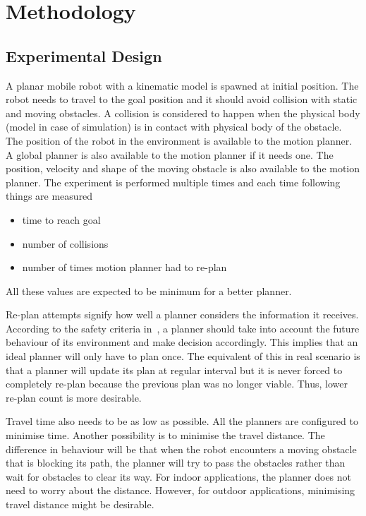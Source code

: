 \chapter{Methodology}

\section{Experimental Design}
\label{sec:experimental_design}
A planar mobile robot with a kinematic model is spawned at initial position. 
The robot needs to travel to the goal position and it should avoid collision with static and moving obstacles. 
A collision is considered to happen when the physical body (model in case of simulation)
is in contact with physical body of the obstacle.
The position of the robot in the environment is available to the motion planner.
A global planner is also available to the motion planner if it needs one.
The position, velocity and shape of the moving obstacle is also available to the motion
planner.
The experiment is performed multiple times and each time following things are measured
\begin{itemize}
    \item time to reach goal
    \item number of collisions
    \item number of times motion planner had to re-plan
\end{itemize}
All these values are expected to be minimum for a better planner.

Re-plan attempts signify how well a planner considers the information it receives. According to
the safety criteria in~\cite{fraichard2007short}, a planner should take into account the future behaviour
of its environment and make decision accordingly. This implies that an ideal planner will only have
to plan once. The equivalent of this in real scenario is that a planner will update its plan at 
regular interval but it is never forced to completely re-plan because the previous plan was no longer 
viable. Thus, lower re-plan count is more desirable. 

Travel time also needs to be as low as possible. All the planners are configured to minimise time.
Another possibility is to minimise the travel distance. The difference in behaviour will be that 
when the robot encounters a moving obstacle that is blocking its path, the planner will try to pass
the obstacles rather than wait for obstacles to clear its way. For indoor applications, the planner
does not need to worry about the distance. However, for outdoor applications, minimising travel
distance might be desirable.

